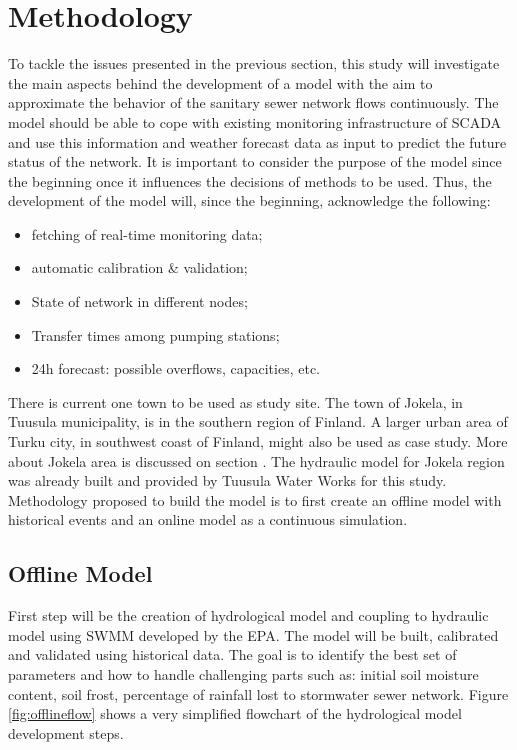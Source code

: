 \chapter{Methodology}

To tackle the issues presented in the previous section, this study will investigate the main aspects behind the development of a model with the aim to approximate the behavior of the sanitary sewer network flows continuously. The model should be able to cope with existing monitoring infrastructure of \acf{SCADA} and use this information and weather forecast data as input to predict the future status of the network. It is important to consider the purpose of the model since the beginning once it influences the decisions of methods to be used. Thus, the development of the model will, since the beginning, acknowledge the following:
\begin{itemize}
    \item fetching of real-time monitoring data;
    \item automatic calibration \& validation;
    \item State of network in different nodes;
    \item Transfer times among pumping stations;
    \item 24h forecast: possible overflows, capacities, etc.
\end{itemize}

There is current one town to be used as study site. The town of Jokela, in Tuusula municipality, is in the southern region of Finland. A larger urban area of Turku city, in southwest coast of Finland, might also be used as case study. More about Jokela area is discussed on section . The hydraulic model for Jokela region was already built and provided by Tuusula Water Works for this study. 
Methodology proposed to build the model is to first create an offline model with historical events and an online model as a continuous simulation. 

\section{Offline Model}
First step will be the creation of hydrological model and coupling to hydraulic model using \acf{SWMM} developed by the \acf{EPA}. The model will be built, calibrated and validated using historical data. The goal is to identify the best set of parameters and how to handle challenging parts such as: initial soil moisture content, soil frost, percentage of rainfall lost to stormwater sewer network. Figure \ref{fig:offlineflow} shows a very simplified flowchart of the hydrological model development steps.


